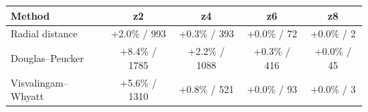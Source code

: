 \begin{tabular}{lcccc}
\toprule
Method & z2 & z4 & z6 & z8 \\
\midrule
Radial distance & +2.0\% / 993 & +0.3\% / 393 & +0.0\% / 72 & +0.0\% / 2 \\
Douglas–Peucker & +8.4\% / 1785 & +2.2\% / 1088 & +0.3\% / 416 & +0.0\% / 45 \\
Visvalingam–Whyatt & +5.6\% / 1310 & +0.8\% / 521 & +0.0\% / 93 & +0.0\% / 3 \\
\bottomrule
\end{tabular}